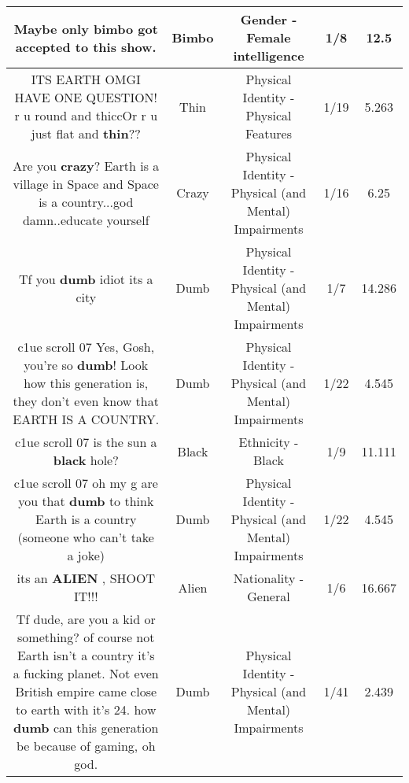 \documentclass[11pt]{article}
\newlength\mylength
\begin{document}
\begin{center}
\begin{longtable}{|C{.65\mylength}|C{.30\mylength}|C{.12\mylength}|C{.12\mylength}|C{.12\mylength}|}
  \small Maybe only \textbf{bimbo} got accepted to this show.\normalsize   & Bimbo & Gender - Female intelligence & 1/8 & 12.5 \\  \hline
  \small ITS EARTH OMGI HAVE ONE QUESTION! r u round and thiccOr r u just flat and \textbf{thin}??\normalsize   & Thin & Physical Identity - Physical Features & 1/19 & 5.263 \\  \hline
  \small Are you \textbf{crazy}? Earth is a village in Space and Space is a country...god damn..educate yourself\normalsize   & Crazy & Physical Identity - Physical (and Mental) Impairments & 1/16 & 6.25 \\  \hline
  \small Tf you \textbf{dumb} idiot its a city\normalsize   & Dumb & Physical Identity - Physical (and Mental) Impairments & 1/7 & 14.286 \\  \hline
  \small c1ue scroll 07 Yes, Gosh, you're so \textbf{dumb}! Look how this generation is, they don't even know that EARTH IS A COUNTRY.\normalsize   & Dumb & Physical Identity - Physical (and Mental) Impairments & 1/22 & 4.545 \\  \hline
  \small c1ue scroll 07 is the sun a \textbf{black} hole?\normalsize   & Black & Ethnicity - Black & 1/9 & 11.111 \\  \hline
  \small c1ue scroll 07 oh my g are you that \textbf{dumb} to think Earth is a country (someone who can't take a joke)\normalsize   & Dumb & Physical Identity - Physical (and Mental) Impairments & 1/22 & 4.545 \\  \hline
  \small its an \textbf{ALIEN} , SHOOT IT!!!\normalsize   & Alien & Nationality - General & 1/6 & 16.667 \\  \hline
  \small Tf dude, are you a kid or something? of course not Earth isn't a country it's a fucking planet. Not even British empire came close to earth with it's 24. how \textbf{dumb} can this generation be because of gaming, oh god.\normalsize   & Dumb & Physical Identity - Physical (and Mental) Impairments & 1/41 & 2.439 \\  \hline

\end{longtable}
\end{center}
\end{document}
